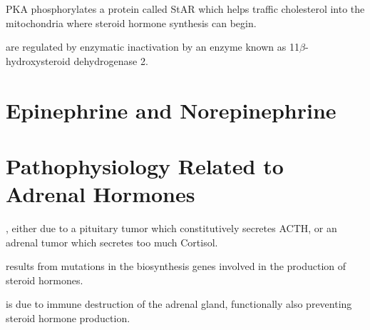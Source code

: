 \documentclass{tufte-handout}
\begin{document}
PKA phosphorylates a protein called StAR which helps traffic cholesterol into the mitochondria where steroid hormone synthesis can begin.  

 are regulated by enzymatic inactivation by an enzyme known as 11$\beta$-hydroxysteroid dehydrogenase 2.

\section{Epinephrine and Norepinephrine}

\section{Pathophysiology Related to Adrenal Hormones}

, either due to a pituitary tumor which constitutively secretes ACTH, or an adrenal tumor which secretes too much Cortisol.

 results from mutations in the biosynthesis genes involved in the production of steroid hormones.

 is due to immune destruction of the adrenal gland, functionally also preventing steroid hormone production.

\listoffigures
\listoftables



\end{document}
